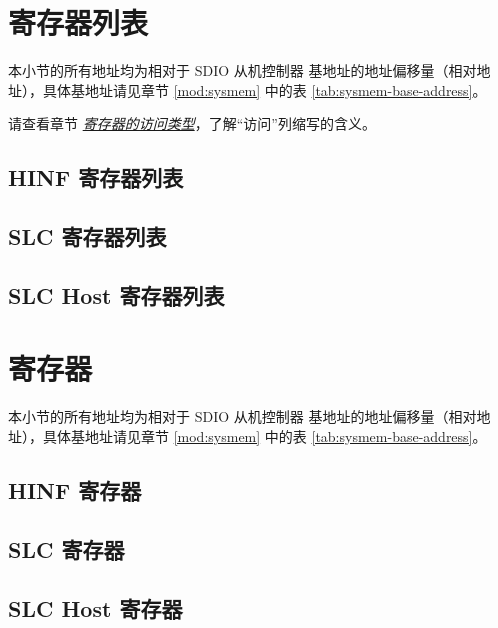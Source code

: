 \documentclass[main\_\_CN.tex]{subfiles}
\begin{document}
\section{寄存器列表}
\label{sec:sdioslave-reg-summ}

本小节的所有地址均为相对于 SDIO 从机控制器 基地址的地址偏移量（相对地址），具体基地址请见章节 \ref{mod:sysmem} \textit{} 中的表 \ref{tab:sysmem-base-address}。

请查看章节 \hyperref[glossary-access-types]{\textit{寄存器的访问类型}}，了解“访问”列缩写的含义。

\subsection{HINF 寄存器列表}
\label{sec:sdioslave-hinf-reg-summ}



\subsection{SLC 寄存器列表}
\label{sec:sdioslave-slc-reg-summ}



\subsection{SLC Host 寄存器列表}
\label{sec:sdioslave-slc-host-reg-summ}





\clearpage
\section{寄存器}

本小节的所有地址均为相对于 SDIO 从机控制器 基地址的地址偏移量（相对地址），具体基地址请见章节 \ref{mod:sysmem} \textit{} 中的表 \ref{tab:sysmem-base-address}。

\subsection{HINF 寄存器}
\label{sec:sdioslave-hinf-reg}



\subsection{SLC 寄存器}
\label{sec:sdioslave-slc-reg}



\subsection{SLC Host 寄存器}
\label{sec:sdioslave-slc-host-reg}


\end{document}

